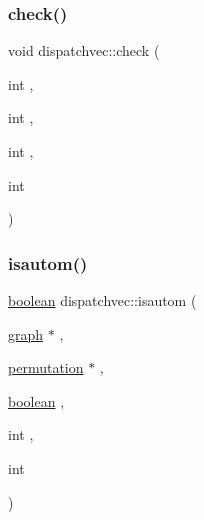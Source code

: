 \mbox{\label{structdispatchvec_ab39aac88a709a5be3f294ad50c30991a}} 
\subsubsection{\texorpdfstring{check()}{check()}}
{\footnotesize\ttfamily void dispatchvec\+::check (\begin{DoxyParamCaption}\item[{int}]{,  }\item[{int}]{,  }\item[{int}]{,  }\item[{int}]{ }\end{DoxyParamCaption})}

\mbox{\label{structdispatchvec_a4437d6c12683af56ce0085c28d680324}} 
\subsubsection{\texorpdfstring{isautom()}{isautom()}}
{\footnotesize\ttfamily \mbox{\hyperlink{nauty_8h_a621c38f1f10a1c565d897e3178b16d6e}{boolean}} dispatchvec\+::isautom (\begin{DoxyParamCaption}\item[{\mbox{\hyperlink{nauty_8h_a28c08db7c5948ab173e0f0497773f2f1}{graph}} $\ast$}]{,  }\item[{\mbox{\hyperlink{classpermutation}{permutation}} $\ast$}]{,  }\item[{\mbox{\hyperlink{nauty_8h_a621c38f1f10a1c565d897e3178b16d6e}{boolean}}}]{,  }\item[{int}]{,  }\item[{int}]{ }\end{DoxyParamCaption})}

\mbox{\label{structdispatchvec_a0c9545ae6bc9b28c721ba846a1d03df9}} 
